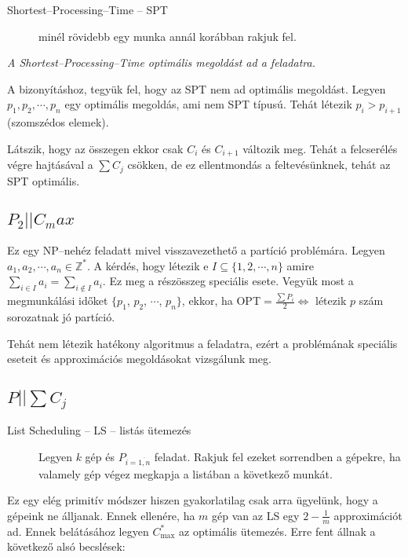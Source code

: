 \begin{description}
  \item[Shortest--Processing--Time -- SPT] minél rövidebb egy munka annál korábban
  rakjuk fel.
\end{description}

\emph{A Shortest--Processing--Time optimális megoldást ad a feladatra.}
\vspace{0.4cm}

A bizonyításhoz, tegyük fel, hogy az SPT nem ad optimális megoldást. Legyen
$p_1, p_2, \cdots, p_n$ egy optimális megoldás, ami nem SPT típusú. Tehát
létezik $p_i>p_{i+1}$ (szomszédos elemek). 

Látszik, hogy az összegen ekkor csak $C_i$ és $C_{i+1}$ változik meg. Tehát a
felcserélés végre hajtásával a $\sum C_j$ csökken, de ez ellentmondás a
feltevésünknek, tehát az SPT optimális.

\subsection{ \texorpdfstring {$ P_2||C_max$} {P2||Cmax} }

Ez egy NP--nehéz feladatt mivel visszavezethető a partíció problémára. Legyen
$a_1, a_2, \cdots, a_n \in \mathbb{Z}^*$. A kérdés, hogy létezik e $I \subseteq
\{1,2, \cdots, n \}$ amire $\sum_{i \in I} a_i = \sum_{i \not \in I} a_i$. Ez
meg a részösszeg speciális esete. Vegyük most a megmunkálási időket $\{p_1$, $p_2$,
$\cdots$, $p_n\}$, ekkor, ha OPT$=\frac{\sum P_i}{2} \Leftrightarrow$ létezik $p$
szám sorozatnak jó partíció. 

Tehát nem létezik hatékony algoritmus a feladatra, ezért a problémának speciális
eseteit és approximációs megoldásokat vizsgálunk meg.

\subsection{ \texorpdfstring {$ P||\sum C_j$} {P||Cmax} }

\begin{description}
  \item[List Scheduling -- LS -- listás ütemezés] Legyen $k$ gép és
  $P_{i=\overline{1,n}}$ feladat. Rakjuk fel ezeket sorrendben a gépekre, ha
  valamely gép végez megkapja a listában a következő munkát.
\end{description}

Ez egy elég primitív módszer hiszen gyakorlatilag csak arra ügyelünk, hogy a
gépeink ne álljanak. Ennek ellenére, ha $m$ gép van  az LS egy $2 - \frac{1}{m}$
approximációt ad. Ennek belátásához legyen $C^*_{\mbox{max}}$ az optimális
ütemezés. Erre fent állnak a következő alsó becslések:

